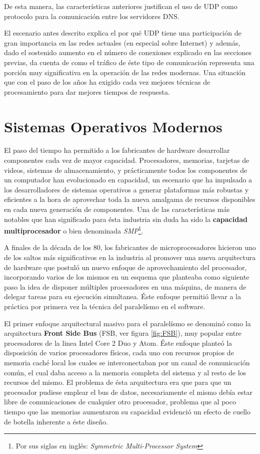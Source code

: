 De esta manera, las características anteriores justifican el uso de UDP como protocolo para la comunicación entre los servidores DNS.

El escenario antes descrito explica el por qué UDP tiene una participación de gran importancia en las redes actuales (en especial sobre Internet) y además, dado el sostenido aumento en el número de conexiones explicado en las secciones previas, da cuenta de como el tráfico de éste tipo de comunicación representa una porción muy significativa en la operación de las redes modernas. Una situación que con el paso de los años ha exigido cada vez mejores técnicas de procesamiento para dar mejores tiempos de respuesta.

\section{Sistemas Operativos Modernos}
El paso del tiempo ha permitido a los fabricantes de hardware desarrollar componentes cada vez de mayor capacidad. Procesadores, memorias, tarjetas de videos, sistemas de almacenamiento, y prácticamente todos los componentes de un computador han evolucionado en capacidad, un escenario que ha impulsado a los desarrolladores de sistemas operativos a generar plataformas más robustas y eficientes a la hora de aprovechar toda la nueva amalgama de recursos disponibles en cada nueva generación de componentes. Una de las características más notables que han significado para ésta industria sin duda ha sido la \textbf{capacidad multiprocesador} o bien denominada \emph{SMP}\footnote{Por sus siglas en inglés: \textit{Symmetric Multi-Processor System}}.

A finales de la década de los 80, los fabricantes de microprocesadores hicieron uno de los saltos más significativos en la industria al promover una nueva arquitectura de hardware que postuló un nuevo enfoque de aprovechamiento del procesador, incorporando varios de los mismos en un esquema que planteaba como siguiente paso la idea de disponer múltiples procesadores en una máquina, de manera de delegar tareas para su ejecución simultanea. Éste enfoque permitió llevar a la práctica por primera vez la técnica del paralelísmo en el software.

El primer enfoque arquitectural masivo para el paralelísmo se denominó como la arquitectura \textbf{Front Side Bus} (FSB, ver figura \ref{fig:FSB}), muy popular entre procesadores de la linea Intel Core 2 Duo y Atom. Éste enfoque planteó la disposición de varios procesadores físicos, cada uno con recursos propios de memoria caché local los cuales se interconectaban por un canal de comunicación común, el cual daba acceso a la memoria completa del sistema y al resto de los recursos del mismo. El problema de ésta arquitectura era que para que un procesador pudiese emplear el bus de datos, necesariamente el mismo debía estar libre de comunicaciones de cualquier otro procesador, problema que al poco tiempo que las memorias aumentaron su capacidad evidenció un efecto de cuello de botella inherente a éste diseño.

